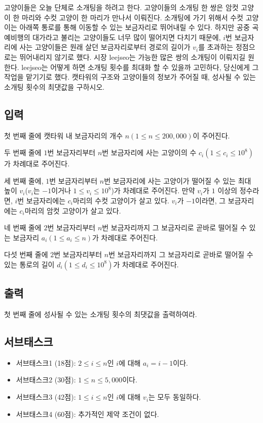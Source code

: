 \documentclass{article}
\begin{document}
고양이들은 오늘 단체로 소개팅을 하려고 한다. 고양이들의 소개팅 한 쌍은 암컷 고양이 한 마리와 수컷 고양이 한 마리가 만나서 이뤄진다. 소개팅에 가기 위해서 수컷 고양이는 아래쪽 통로를 통해 이동할 수 있는 보금자리로 뛰어내릴 수 있다. 하지만 공중 곡예비행의 대가라고 불리는 고양이들도 너무 많이 떨어지면 다치기 때문에, $i$번 보금자리에 사는 고양이들은 원래 살던 보금자리로부터 경로의 길이가 $v_i$를 초과하는 정점으로는 뛰어내리지 않기로 했다. 시장 leejseo는 가능한 많은 쌍의 소개팅이 이뤄지길 원한다. leejseo는 어떻게 하면 소개팅 횟수를 최대화 할 수 있을까 고민하다, 당신에게 그 작업을 맡기기로 했다. 캣타워의 구조와 고양이들의 정보가 주어질 때, 성사될 수 있는 소개팅 횟수의 최댓값을 구하시오.

\subsection{입력}
첫 번째 줄에 캣타워 내 보금자리의 개수 $n (1 \le n \le 200,000)$이 주어진다.
 
두 번째 줄에 $1$번 보금자리부터 $n$번 보금자리에 사는 고양이의 수 $c_i (1 \le c_i \le 10^8)$가 차례대로 주어진다.

세 번째 줄에, $1$번 보금자리부터 $n$번 보금자리에 사는 고양이가 떨어질 수 있는 최대 높이 $v_i$($v_i$는 $-1$이거나 $1 \le v_i \le 10^8$)가 차례대로 주어진다. 만약 $v_i$가 $1$ 이상의 정수라면, $i$번 보금자리에는 $c_i$마리의 수컷 고양이가 살고 있다. $v_i$가 $-1$이라면, 그 보금자리에는 $c_i$마리의 암컷 고양이가 살고 있다.

네 번째 줄에 $2$번 보금자리부터 $n$번 보금자리까지 그 보금자리로 곧바로 떨어질 수 있는 보금자리 $a_i (1 \le a_i \le n)$가 차례대로 주어진다.

다섯 번째 줄에 $2$번 보금자리부터 $n$번 보금자리까지 그 보금자리로 곧바로 떨어질 수 있는 통로의 길이 $d_i (1 \le d_i \le 10^8)$가 차례대로 주어진다.    

\subsection{출력}
첫 번째 줄에 성사될 수 있는 소개팅 횟수의 최댓값을 출력하여라.

\subsection{서브태스크}
\begin{itemize}
	\item 서브태스크1 (18점): $2 \le i \le n$인 $i$에 대해 $a_i=i-1$이다.
	\item 서브태스크2 (30점): $1 \le n \le 5,000$이다.
	\item 서브태스크3 (42점): $1 \le i \le n$인 $i$에 대해 $v_i$는 모두 동일하다.
	\item 서브태스크4 (60점): 추가적인 제약 조건이 없다.
\end{itemize}
\end{document}
